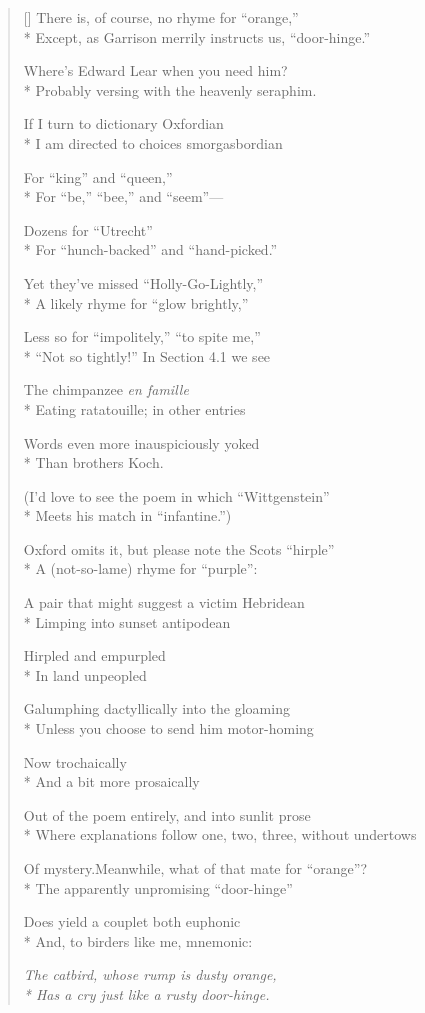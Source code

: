 \label{ch:on_first_looking}
\settowidth{\versewidth}{Of mystery.          Meanwhile, what of that mate for ``orange''?}
\begin{verse}[\versewidth]
There is, of course, no rhyme for ``orange,''\\*
Except, as Garrison merrily instructs us, ``door-hinge.''

Where's Edward Lear when you need him?\\*
Probably versing with the heavenly seraphim.

If I turn to dictionary Oxfordian\\*
I am directed to choices smorgasbordian

For ``king'' and ``queen,''\\*
For ``be,'' ``bee,'' and ``seem''---

Dozens for ``Utrecht''\\*
For ``hunch-backed'' and ``hand-picked.''

Yet they've missed ``Holly-Go-Lightly,''\\*
A likely rhyme for ``glow brightly,''

Less so for ``impolitely,'' ``to spite me,''\\*
``Not so tightly!''    In Section 4.1 we see

The chimpanzee \textit{en famille}\\*
Eating ratatouille; in other entries

Words even more inauspiciously yoked\\*
Than brothers Koch.

(I'd love to see the poem in which ``Wittgenstein''\\*
Meets his match in ``infantine.'')

Oxford omits it, but please note the Scots ``hirple''\\*
A (not-so-lame) rhyme for ``purple'':

A pair that might suggest a victim Hebridean\\*
Limping into sunset antipodean

Hirpled and empurpled\\*
In land unpeopled

Galumphing dactyllically into the gloaming\\*
Unless you choose to send him motor-homing

Now trochaically\\*
And a bit more prosaically

Out of the poem entirely, and into sunlit prose\\*
Where explanations follow one, two, three, without undertows

Of mystery.\qquad Meanwhile, what of that mate for ``orange''?\\*
The apparently unpromising ``door-hinge''

Does yield a couplet both euphonic\\*
And, to birders like me, mnemonic:

\qquad \textit{The catbird, whose rump is dusty orange,\\*
\qquad Has a cry just like a rusty door-hinge.}
\end{verse}
